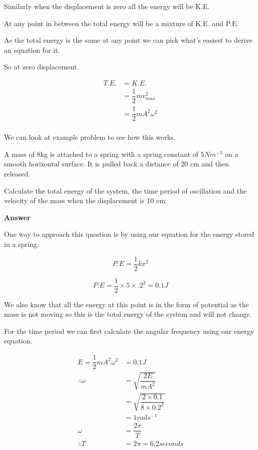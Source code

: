 \documentclass[revision-guide.tex]{subfiles}
\begin{document}
Similarly when the displacement is zero all the energy will be K.E.

At any point in between the total energy will be a mixture of K.E. and P.E. 

As the total energy is the same at any point we can pick what's easiest to derive an equation for it.

So at zero displacement.

\begin{align*} 
T.E. &= K.E. \\
&= \dfrac{1}{2}mv_{max}^2 \\
&= \dfrac{1}{2}mA^2\omega^2 \\
\end{align*}


We can look at example problem to see how this works.


\begin{example}

A mass of 8kg is attached to a spring with a spring constant of $5 Nm^{-1}$ on a smooth horizontal surface.
It is pulled back a distance of 20 cm and then released. 

Calculate the total energy of the system, the time period of oscillation and the velocity of the mass when the displacement is 10 cm.


\end{example}





    
\textbf{Answer}

One way to approach this question is by using our equation for the energy stored in a spring.

\[
P.E = \dfrac{1}{2}kx^2
\]

\[
P.E = \dfrac{1}{2} \times 5 \times .2^2 = 0.1J
\]

We also know that all the energy at this point is in the form of potential as the mass is not moving so this is the total energy of the system and will not change.



For the time period we can first calculate the angular frequency using our energy equation.

\begin{align*} 
E = \dfrac{1}{2}mA^2\omega^2 &= 0.1 J\\
\therefore \omega &= \sqrt{\dfrac{2 E}{m A^2}}\\
&= \sqrt{\dfrac{2 \times 0.1}{8 \times 0.2^2}}\\
&= 1 rads^{-1}\\
\omega &= \dfrac{2 \pi}{T} \\
\therefore T &= 2 \pi = 6.2 seconds \\
\end{align*}
\end{document}
